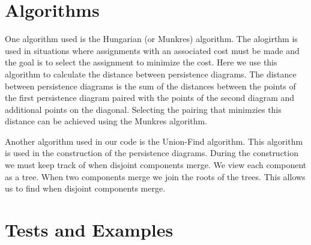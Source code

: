 \documentclass[codesnippet]{jss}
\begin{document}
\section[algorithm]{Algorithms}
One algorithm used is the Hungarian (or Munkres) algorithm.  The alogirthm is used in situations where assignments with an associated cost must be made and the goal is to select the assignment to minimize the cost.  Here we use this algorithm to calculate the distance between persistence diagrams. The distance between persistence diagrams is the sum of the distances between the points of the first persistence diagram paired with the points of the second diagram and additional points on the diagonal.  Selecting the pairing that minimzies this distance can be achieved using the Munkres algorithm.

Another algorithm used in our code is the Union-Find algorithm.  This algorithm is used in the construction of the persistence diagrams. During the construction we must keep track of when disjoint components merge.  We view each component as a tree.  When two components merge we join the roots of the trees.  This allows us to find when disjoint components merge.

\section[tests and examples]{Tests and Examples}
\end{document}

